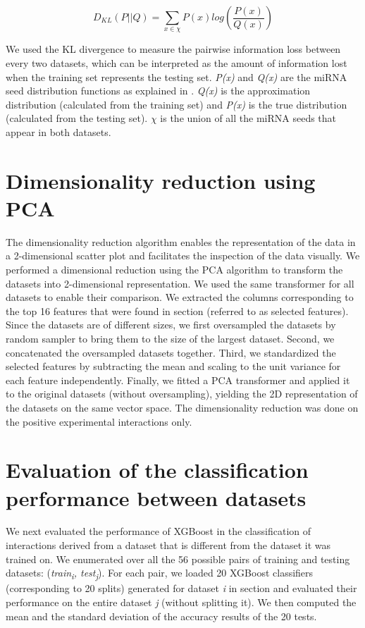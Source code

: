 \begin{equation}
 D_{KL} \left (P ||Q \right ) = \sum_{x\in \chi }{P\left ( x \right )log\left ( \frac{P\left ( x \right )}{Q\left ( x \right )} \right )}\label{eq:1}
\end{equation}

We used the KL divergence to measure the pairwise information loss between every two datasets, which can be interpreted as the amount of information lost when the training set represents the testing set. \textit{P(x)} and \textit{Q(x)} are the miRNA seed distribution functions as explained in . \textit{Q(x)} is the approximation distribution (calculated from the training set) and \textit{P(x)} is the true distribution (calculated from the testing set). $\chi$ is the union of all the miRNA seeds that appear in both datasets.

\section{Dimensionality reduction using PCA}
The dimensionality reduction algorithm enables the representation of the data in a 2-dimensional scatter plot and facilitates the inspection of the data visually. We performed a dimensional reduction using the PCA algorithm to transform the datasets into 2-dimensional representation. 
We used the same transformer for all datasets to enable their comparison. 
We extracted the columns corresponding to the top 16 features that were found in section  (referred to as selected features). Since the datasets are of different sizes, we first oversampled the datasets by random sampler to bring them to the size of the largest dataset. Second, we concatenated the oversampled datasets together. Third, we standardized the selected features by subtracting the mean and scaling to the unit variance for each feature independently. Finally, we fitted a PCA transformer and applied it to the original datasets (without oversampling), yielding the 2D representation of the datasets on the same vector space. The dimensionality reduction was done on the positive experimental interactions only.

\section{Evaluation of the classification performance between datasets}
We next evaluated the performance of XGBoost in the classification of interactions derived from a dataset that is different from the dataset it was trained on. We enumerated over all the 56 possible pairs of training and testing datasets: (\textit{train\textsubscript{i}, test\textsubscript{j}}). For each pair, we loaded 20 XGBoost classifiers (corresponding to 20 splits) generated for dataset \textit{i} in section  and evaluated their performance on the entire dataset \textit{j} (without splitting it). We then computed the mean and the standard deviation of the accuracy results of the 20 tests.





